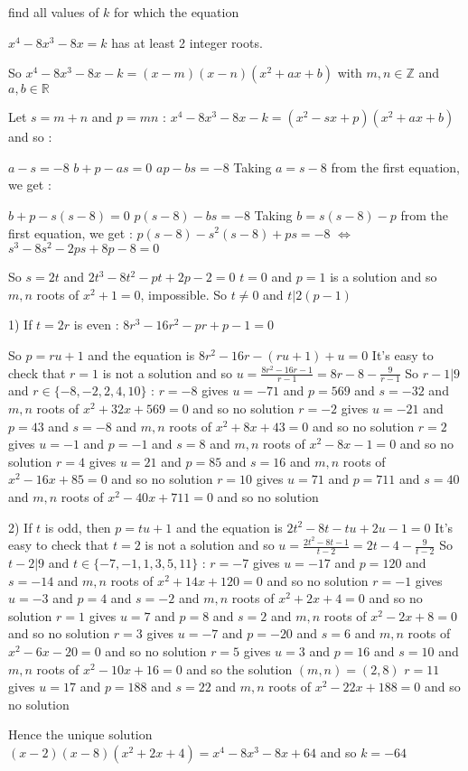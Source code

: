 \begin{solution}
	\begin{tcolorbox}find all values of $k$ for which the equation

$x^4 - 8 x^3 - 8x = k$ has at least 2 integer roots.\end{tcolorbox}
So $x^4-8x^3-8x-k=(x-m)(x-n)(x^2+ax+b)$ with $m,n\in\mathbb Z$ and $a,b\in\mathbb R$ 

Let $s=m+n$ and $p=mn$ : $x^4-8x^3-8x-k=(x^2-sx+p)(x^2+ax+b)$ and so :

$a-s=-8$
$b+p-as=0$
$ap-bs=-8$
Taking $a=s-8$ from the first equation, we get :

$b+p-s(s-8)=0$
$p(s-8)-bs=-8$
Taking $b=s(s-8)-p$ from the first equation, we get : $p(s-8)-s^2(s-8)+ps=-8$ $\iff$ $s^3-8s^2-2ps+8p-8=0$

So $s=2t$ and $2t^3-8t^2-pt+2p-2=0$
$t=0$ and $p=1$ is a solution and so $m,n$ roots of $x^2+1=0$, impossible. So $t\ne 0$ and $t|2(p-1)$

1) If $t=2r$ is even : $8r^3-16r^2-pr+p-1=0$

So $p=ru+1$ and the equation is $8r^2-16r-(ru+1)+u=0$ 
It's easy to check that $r=1$ is not a solution and so $u=\frac{8r^2-16r-1}{r-1}=8r-8-\frac 9{r-1}$
So $r-1|9$ and $r\in\{-8,-2,2,4,10\}$ :
$r=-8$ gives $u=-71$ and $p=569$ and $s=-32$ and $m,n$ roots of $x^2+32x+569=0$ and so no solution
$r=-2$ gives $u=-21$ and $p=43$ and $s=-8$ and $m,n$ roots of $x^2+8x+43=0$ and so no solution
$r=2$ gives $u=-1$ and $p=-1$ and $s=8$ and $m,n$ roots of $x^2-8x-1=0$ and so no solution
$r=4$ gives $u=21$ and $p=85$ and $s=16$ and $m,n$ roots of $x^2-16x+85=0$ and so no solution
$r=10$ gives $u=71$ and $p=711$ and $s=40$ and $m,n$ roots of $x^2-40x+711=0$ and so no solution

2) If $t$ is odd, then $p=tu+1$ and the equation is $2t^2-8t-tu+2u-1=0$
It's easy to check that $t=2$ is not a solution and so $u=\frac{2t^2-8t-1}{t-2}=2t-4-\frac 9{t-2}$
So $t-2|9$ and $t\in\{-7,-1,1,3,5,11\}$ :
$r=-7$ gives $u=-17$ and $p=120$ and $s=-14$ and $m,n$ roots of $x^2+14x+120=0$ and so no solution
$r=-1$ gives $u=-3$ and $p=4$ and $s=-2$ and $m,n$ roots of $x^2+2x+4=0$ and so no solution
$r=1$ gives $u=7$ and $p=8$ and $s=2$ and $m,n$ roots of $x^2-2x+8=0$ and so no solution
$r=3$ gives $u=-7$ and $p=-20$ and $s=6$ and $m,n$ roots of $x^2-6x-20=0$ and so no solution
$r=5$ gives $u=3$ and $p=16$ and $s=10$ and $m,n$ roots of $x^2-10x+16=0$ and so the solution $(m,n)=(2,8)$
$r=11$ gives $u=17$ and $p=188$ and $s=22$ and $m,n$ roots of $x^2-22x+188=0$ and so no solution

Hence the unique solution $(x-2)(x-8)(x^2+2x+4)=x^4-8x^3-8x+64$ and so $\boxed{k=-64}$
\end{solution}



